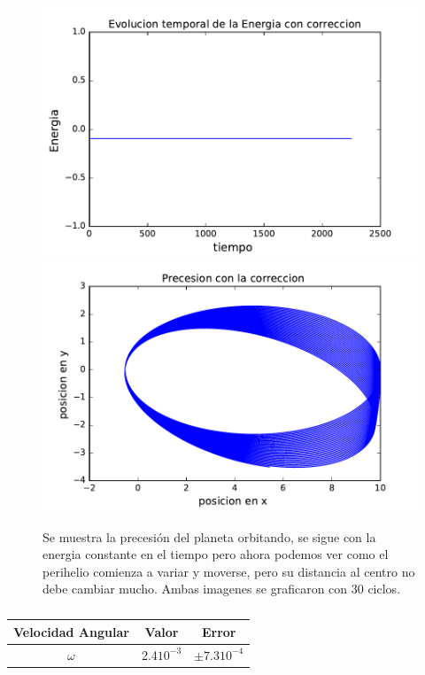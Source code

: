 \documentclass[10pt]{article}
\begin{document}
\begin{figure}[H]
\centering
\includegraphics[scale=0.5]{energia_verlet_30.pdf}
\includegraphics[scale=0.5]{pres_verlet_30.pdf}
\caption{Se muestra la precesión del planeta orbitando, se sigue con la energia constante en el tiempo pero ahora podemos ver como el perihelio comienza a variar y moverse, pero su distancia al centro no debe cambiar mucho. Ambas imagenes se graficaron con 30 ciclos.}
\label{img_energiayprec_30}
\end{figure}

\begin{table}[H]
\centering
\begin{tabular}{|c|c|c|}
\hline
Velocidad Angular & Valor & Error \\
\hline
$\omega$ & 2.4$10^{-3}$ & $\pm 7.310^{-4}$ \\
\hline
\end{tabular}
\caption{}
\label{tab_omega}
\end{table}
\end{document}
